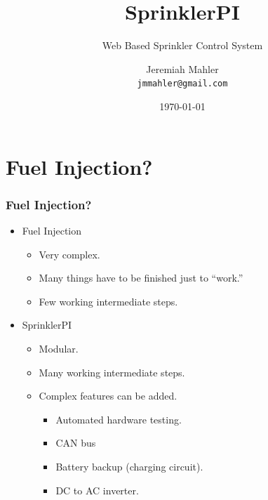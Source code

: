 \documentclass[gray]{beamer}
\title{SprinklerPI}
\subtitle{Web Based Sprinkler Control System}
\author[Jeremiah Mahler]{\large{Jeremiah Mahler} \\ \footnotesize\texttt{jmmahler@gmail.com}}
\institute{California State University Chico}
\date{\small{\today}}
\begin{document}
\frame{\titlepage}



\section{Fuel Injection?}
\begin{frame}
\frametitle{Fuel Injection?}
\begin{itemize}
\item Fuel Injection
	\begin{itemize}
		\item Very complex.
		\item Many things have to be finished just to ``work.''
		\item Few working intermediate steps.
	\end{itemize}
\item SprinklerPI
	\begin{itemize}
		\item Modular.
		\item Many working intermediate steps.
		\item Complex features can be added.
		\begin{itemize}
			\item Automated hardware testing.
			\item CAN bus
			\item Battery backup (charging circuit).
			\item DC to AC inverter.
		\end{itemize}
	\end{itemize}
\end{itemize}
\end{frame}

\end{document}

